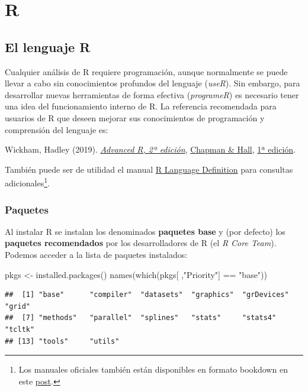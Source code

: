 \documentclass[
]{book}
\newenvironment{Shaded}{\begin{snugshade}}{\end{snugshade}}
\newcommand{\FunctionTok}[1]{\textcolor[rgb]{0.00,0.00,0.00}{#1}}
\newcommand{\NormalTok}[1]{#1}
\newcommand{\OtherTok}[1]{\textcolor[rgb]{0.56,0.35,0.01}{#1}}
\newcommand{\SpecialCharTok}[1]{\textcolor[rgb]{0.00,0.00,0.00}{#1}}
\newcommand{\StringTok}[1]{\textcolor[rgb]{0.31,0.60,0.02}{#1}}
\theoremstyle{break}
\theoremstyle{nonumberplain}
\begin{document}
\hypertarget{part-r}{%
\part{R}\label{part-r}}

\hypertarget{r}{%
\chapter{El lenguaje R}\label{r}}

Cualquier análisis de R requiere programación, aunque normalmente se puede llevar a cabo sin conocimientos profundos del lenguaje (\emph{useR}).
Sin embargo, para desarrollar nuevas herramientas de forma efectiva (\emph{programeR}) es necesario tener una idea del funcionamiento interno de R.
La referencia recomendada para usuarios de R que deseen mejorar sus conocimientos de programación y comprensión del lenguaje es:

Wickham, Hadley (2019). \emph{\href{https://adv-r.hadley.nz/}{Advanced R, 2ª edición}}, \href{https://www.amazon.com/dp/0815384572}{Chapman \& Hall}, \href{http://adv-r.had.co.nz/}{1ª edición}.

También puede ser de utilidad el manual \href{https://cran.r-project.org/doc/manuals/R-lang.html}{R Language Definition}
para consultas adicionales\footnote{Los manuales oficiales también están disponibles en formato bookdown en este \href{https://colinfay.me/r-manuals}{post}.}.

\hypertarget{paquetes}{%
\section{Paquetes}\label{paquetes}}

Al instalar R se instalan los denominados \textbf{paquetes base} y (por defecto) los \textbf{paquetes recomendados} por los desarrolladores de R (el \emph{R Core Team}).
Podemos acceder a la lista de paquetes instalados:

\begin{Shaded}
\begin{Highlighting}[]
\NormalTok{pkgs }\OtherTok{\textless{}{-}} \FunctionTok{installed.packages}\NormalTok{()}
\FunctionTok{names}\NormalTok{(}\FunctionTok{which}\NormalTok{(pkgs[ ,}\StringTok{"Priority"}\NormalTok{] }\SpecialCharTok{==} \StringTok{"base"}\NormalTok{))}
\end{Highlighting}
\end{Shaded}

\begin{verbatim}
##  [1] "base"      "compiler"  "datasets"  "graphics"  "grDevices" "grid"     
##  [7] "methods"   "parallel"  "splines"   "stats"     "stats4"    "tcltk"    
## [13] "tools"     "utils"
\end{verbatim}
\end{document}
